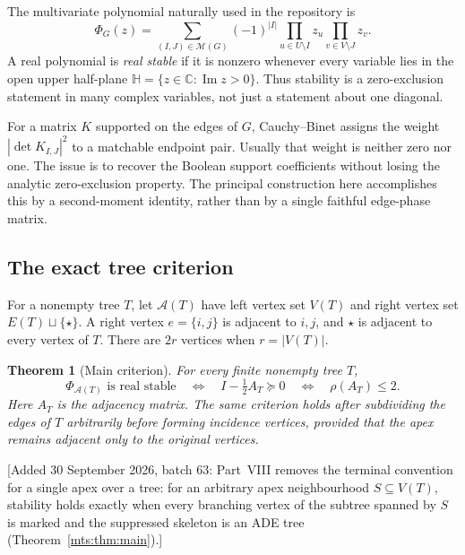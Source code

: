 \documentclass[11pt]{article}
\numberwithin{equation}{section}
\newtheorem{theorem}{Theorem}[section]
\theoremstyle{definition}
\newcommand{\C}{\mathbb C}
\newcommand{\PM}{\mathcal M}
\newcommand{\HH}{\mathbb H}
\newcommand{\calA}{\mathcal A}
\newcommand{\im}{\operatorname{Im}}
\begin{document}
The multivariate polynomial naturally used in the repository is
\begin{equation}
 \Phi_G(z)=\sum_{(I,J)\in\PM(G)}(-1)^{|I|}
       \prod_{u\in U\setminus I}z_u
       \prod_{v\in V\setminus J}z_v.
 \label{ade:eq:Phidef}
\end{equation}
A real polynomial is \emph{real stable} if it is nonzero whenever every
variable lies in the open upper half-plane
$\HH=\{z\in\C:\im z>0\}$.  Thus stability is a zero-exclusion statement
in many complex variables, not just a statement about one diagonal.

For a matrix $K$ supported on the edges of $G$, Cauchy--Binet assigns the
weight $|\det K_{I,J}|^2$ to a matchable endpoint pair.  Usually that weight
is neither zero nor one.  The issue is to recover the Boolean support
coefficients without losing the analytic zero-exclusion property.
The principal construction here accomplishes this by a second-moment
identity, rather than by a single faithful edge-phase matrix.

\subsection{The exact tree criterion}

For a nonempty tree $T$, let $\calA(T)$ have left vertex set $V(T)$ and
right vertex set $E(T)\sqcup\{\star\}$.  A right vertex $e=\{i,j\}$ is
adjacent to $i,j$, and $\star$ is adjacent to every vertex of $T$.
There are $2r$ vertices when $r=|V(T)|$.

\begin{theorem}[Main criterion]
\label{ade:thm:intromain}
For every finite nonempty tree $T$,
\begin{equation}
 \boxed{\quad
 \Phi_{\calA(T)}\text{ is real stable}
 \quad\Longleftrightarrow\quad
 I-\tfrac12 A_T\succeq0
 \quad\Longleftrightarrow\quad
 \rho(A_T)\le2.
 \quad}
 \label{ade:eq:intromain}
\end{equation}
Here $A_T$ is the adjacency matrix.  The same criterion holds after
subdividing the edges of $T$ arbitrarily before forming incidence vertices,
provided that the apex remains adjacent only to the original vertices.
\end{theorem}
[Added 30 September 2026, batch 63: Part~VIII removes the terminal
convention for a single apex over a tree: for an arbitrary apex
neighbourhood $S\subseteq V(T)$, stability holds exactly when every
branching vertex of the subtree spanned by $S$ is marked and the
suppressed skeleton is an ADE tree (Theorem~\ref{mts:thm:main}).]
\end{document}
